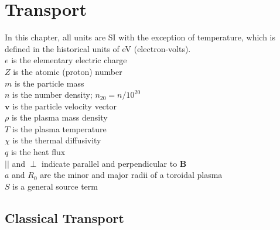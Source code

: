 \chapter{Transport}
In this chapter, all units are SI with the exception of temperature,
which is defined in the historical units of eV (electron-volts).\\

\noindent
$e$ is the elementary electric charge\\
$Z$ is the atomic (proton) number\\
$m$ is the particle mass\\
$n$ is the number density; $n_{20}=n/10^{20}$\\
$\mathbf{v}$ is the particle velocity vector\\
$\rho$ is the plasma mass density\\
$T$ is the plasma temperature\\
$\chi$ is the thermal diffusivity\\
$q$ is the heat flux\\
$||$ and $\perp$ indicate parallel and perpendicular to $\textbf{B}$\\
$a$ and $R_0$ are the minor and major radii of a toroidal plasma\\
$S$ is a general source term \\


\section{Classical Transport}

